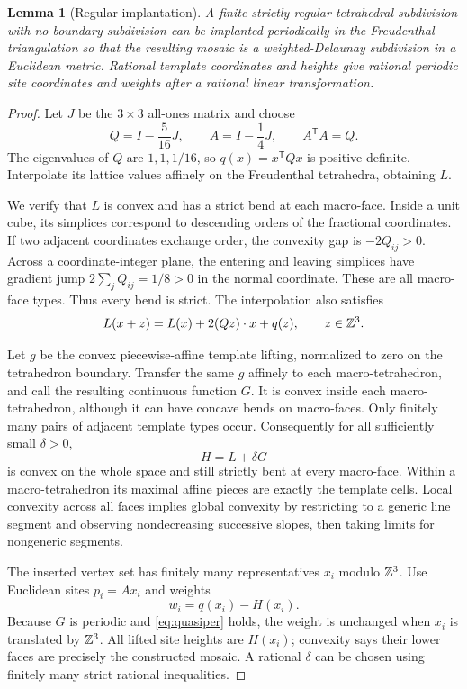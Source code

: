\documentclass[11pt,a4paper]{article}
\newtheorem{lemma}[theorem]{Lemma}
\theoremstyle{definition}\newtheorem{definition}[theorem]{Definition}
\theoremstyle{remark}\newtheorem{remark}[theorem]{Remark}
\begin{document}
\begin{lemma}[Regular implantation]\label{lem:regular}
A finite strictly regular tetrahedral subdivision with no boundary subdivision can be implanted periodically in the Freudenthal triangulation so that the resulting mosaic is a weighted-Delaunay subdivision in a Euclidean metric. Rational template coordinates and heights give rational periodic site coordinates and weights after a rational linear transformation.
\end{lemma}
\begin{proof}
Let \(J\) be the \(3\times3\) all-ones matrix and choose
\[
 Q=I-\frac5{16}J,\qquad A=I-\frac14J,\qquad A^{\mathsf T}A=Q.
\]
The eigenvalues of \(Q\) are \(1,1,1/16\), so \(q(x)=x^{\mathsf T}Qx\) is positive definite. Interpolate its lattice values affinely on the Freudenthal tetrahedra, obtaining \(L\).

We verify that \(L\) is convex and has a strict bend at each macro-face. Inside a unit cube, its simplices correspond to descending orders of the fractional coordinates. If two adjacent coordinates exchange order, the convexity gap is \(-2Q_{ij}>0\). Across a coordinate-integer plane, the entering and leaving simplices have gradient jump \(2\sum_jQ_{ij}=1/8>0\) in the normal coordinate. These are all macro-face types. Thus every bend is strict. The interpolation also satisfies
\begin{equation}\label{eq:quasiper}
 L(x+z)=L(x)+2(Qz)\cdot x+q(z),\qquad z\in\mathbb Z^3.
\end{equation}

Let \(g\) be the convex piecewise-affine template lifting, normalized to zero on the tetrahedron boundary. Transfer the same \(g\) affinely to each macro-tetrahedron, and call the resulting continuous function \(G\). It is convex inside each macro-tetrahedron, although it can have concave bends on macro-faces. Only finitely many pairs of adjacent template types occur. Consequently for all sufficiently small \(\delta>0\),
\[
 H=L+\delta G
\]
is convex on the whole space and still strictly bent at every macro-face. Within a macro-tetrahedron its maximal affine pieces are exactly the template cells. Local convexity across all faces implies global convexity by restricting to a generic line segment and observing nondecreasing successive slopes, then taking limits for nongeneric segments.

The inserted vertex set has finitely many representatives \(x_i\) modulo \(\mathbb Z^3\). Use Euclidean sites \(p_i=Ax_i\) and weights
\[
 w_i=q(x_i)-H(x_i).
\]
Because \(G\) is periodic and \eqref{eq:quasiper} holds, the weight is unchanged when \(x_i\) is translated by \(\mathbb Z^3\). All lifted site heights are \(H(x_i)\); convexity says their lower faces are precisely the constructed mosaic. A rational \(\delta\) can be chosen using finitely many strict rational inequalities.
\end{proof}
\end{document}
